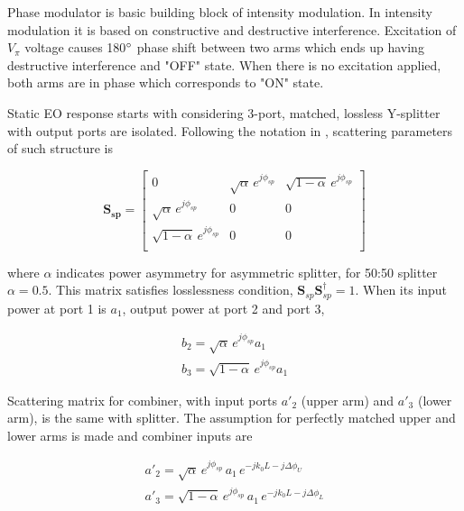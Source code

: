 \documentclass[thesis]{deutez}
\begin{document}
    Phase modulator is basic building block of intensity modulation. In intensity modulation it is based on constructive and destructive interference. Excitation of $V_\pi$ voltage causes 180$\degree$ phase shift between two arms which ends up having destructive interference and "OFF" state. When there is no excitation applied, both arms are in phase which corresponds to "ON" state.
    
    Static EO response starts with considering 3-port, matched, lossless Y-splitter with output ports are isolated. Following the notation in \cite{16}, scattering parameters of such structure is 

    \begin{equation}
        \bm{S_{sp}} =
        \begin{bmatrix}
            0 & \sqrt{\alpha}\,e^{j\phi_{sp}} & \sqrt{1-\alpha}\,e^{j\phi_{sp}}\\
            \sqrt{\alpha}\,e^{j\phi_{sp}} & 0 & 0 \\
            \sqrt{1-\alpha}\,e^{j\phi_{sp}} & 0 & 0\\
            
        \end{bmatrix}
        \label{eq:linear-el-opt-tensor}
    \end{equation}

    where $\alpha$ indicates power asymmetry for asymmetric splitter, for 50:50 splitter $\alpha=0.5$. This matrix satisfies losslessness condition, $\bm S_{sp}\bm S^\dagger_{sp} =1$. When its input power at port 1 is \textit{$a_1$}, output power at port 2 and port 3, 

    \begin{subequations}\label{eq:MZM-splitter-s-matrix}
        \begin{align}
             b_2 = \sqrt{\alpha}\,e^{j\phi_{sp}} a_1 \label{eq:MZM-splitter-s-matrix-b2} \\
             b_3 = \sqrt{1-\alpha}\,e^{j\phi_{sp}} a_1\label{eq:MZM-splitter-s-matrix-b3}
        \end{align}
    \end{subequations}
    
    Scattering matrix for combiner, with input ports \textit{$a'_2$} (upper arm) and \textit{$a'_3$} (lower arm), is the same with splitter. The assumption for perfectly matched upper and lower arms is made and combiner inputs are

    \begin{subequations}\label{eq:MZM-combiner-s-matrix}
        \begin{align}
             a'_2 = \sqrt{\alpha}\,e^{j\phi_{sp}} \,a_1\,e^{-jk_0L-j\Delta\phi_U} \label{eq:MZM-combiner-s-matrix-a2} \\
             a'_3 = \sqrt{1-\alpha}\,e^{j\phi_{sp}} \, a_1\, e^{-jk_0L-j\Delta\phi_L} \label{eq:MZM-combiner-s-matrix-a3}
        \end{align}
    \end{subequations}
    
\end{document}
